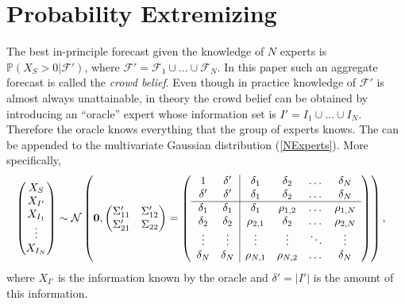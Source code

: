 \documentclass[11pt]{article}
\renewcommand{\P}{\mathbb{P}}
\theoremstyle{definition}
\theoremstyle{definition}
\begin{document}
\section{Probability Extremizing}
\label{extremizing}
The best in-principle forecast given the knowledge of $N$ experts is $\P(X_{S} > 0 |  \mathcal{F}')$, where $\mathcal{F}' = \mathcal{F}_1 \cup \dots \cup \mathcal{F}_N$. In this paper such an aggregate forecast is called the \textit{crowd belief}. Even though in practice knowledge of $\mathcal{F}'$ is almost always unattainable, in theory the crowd belief can be obtained by introducing an ``oracle'' expert whose information set is $I' = I_1 \cup \dots \cup I_N$. Therefore the oracle  knows everything that the group of experts knows. The can be appended to the multivariate Gaussian distribution (\ref{NExperts}). More specifically, 
\begin{align}
\left(\begin{matrix} X_S \\ X_{I'} \\ X_{I_1}\\ \vdots \\ X_{I_N} \end{matrix}\right) &\sim \mathcal{N}\left( 
 \boldsymbol{0}, \left(\begin{matrix} 
\Sigma_{11}' & \Sigma_{12}'\\
\Sigma_{21}' & \Sigma_{22}\\
 \end{matrix}\right) 
 =
 \left(\begin{array}{c c| c c cc }
1 & \delta' & \delta_1 & \delta_2 & \dots & \delta_N  \\ 
\delta' & \delta' & \delta_1 & \delta_2 & \dots & \delta_N  \\ \hline
\delta_1& \delta_1 & \delta_1 &\rho_{1,2} & \dots & \rho_{1,N}   \\ 
\delta_2 & \delta_2 &\rho_{2,1} & \delta_2 & \dots & \rho_{2,N}  \\ 
\vdots &\vdots & \vdots & \vdots & \ddots & \vdots  \\ 
\delta_N &\delta_N & \rho_{N,1} & \rho_{N,2} & \dots & \delta_N\\ 
 \end{array}\right)\right), \label{oracleN} 
\end{align}
where  $X_{I'}$  is the information known by the oracle and $\delta' = |I'|$ is the amount of this information. 
\end{document}
